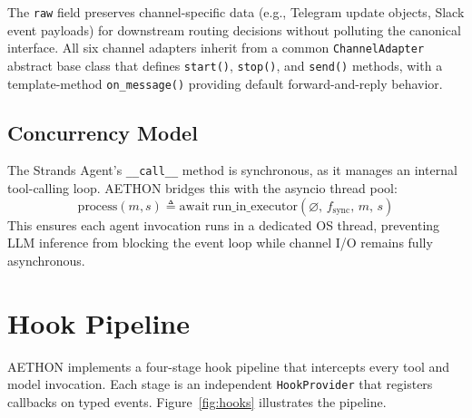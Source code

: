 \documentclass[9pt,twocolumn,letterpaper]{extarticle}
\begin{document}
The \texttt{raw} field preserves channel-specific data (e.g., Telegram update objects, Slack event payloads) for downstream routing decisions without polluting the canonical interface.
All six channel adapters inherit from a common \texttt{ChannelAdapter} abstract base class that defines \texttt{start()}, \texttt{stop()}, and \texttt{send()} methods, with a template-method \texttt{on\_message()} providing default forward-and-reply behavior.

\subsection{Concurrency Model}

The Strands Agent's \texttt{\_\_call\_\_} method is synchronous, as it manages an internal tool-calling loop.
AETHON bridges this with the asyncio thread pool:
%
\begin{equation}
\text{process}(m, s) \triangleq \text{await}~\text{run\_in\_executor}(\varnothing,\, f_{\text{sync}},\, m,\, s)
\label{eq:executor}
\end{equation}
%
\noindent This ensures each agent invocation runs in a dedicated OS thread, preventing LLM inference from blocking the event loop while channel I/O remains fully asynchronous.

\section{Hook Pipeline}
\label{sec:hooks}

AETHON implements a four-stage hook pipeline that intercepts every tool and model invocation.
Each stage is an independent \texttt{HookProvider} that registers callbacks on typed events.
Figure~\ref{fig:hooks} illustrates the pipeline.
\end{document}
